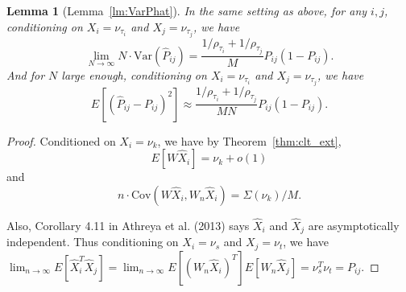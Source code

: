 \documentclass[10pt,letterpaper]{article}
\newtheorem{lemma}[fact]{Lemma}
\begin{document}
\begin{lemma}[Lemma~\ref{lm:VarPhat}]
In the same setting as above, for any $i, j$, conditioning on $X_i = \nu_{\tau_i}$ and $X_j = \nu_{\tau_j}$, we have
\[
	\lim_{N \to \infty} N \cdot \mathrm{Var}(\hat{P}_{ij}) =
    \frac{1/\rho_{\tau_i} + 1/\rho_{\tau_j}}{M} P_{ij} (1 - P_{ij}).
\]
And for $N$ large enough, conditioning on $X_i = \nu_{\tau_i}$ and $X_j = \nu_{\tau_j}$, we have
\[
	E[(\hat{P}_{ij} - P_{ij})^2] \approx
    \frac{1/\rho_{\tau_i} + 1/\rho_{\tau_j}}{M N} P_{ij}(1-P_{ij}).
\]
\end{lemma}
\begin{proof}
Conditioned on $X_i = \nu_k$, we have by Theorem~\ref{thm:clt_ext},
\[
	E[W \hat{X}_i] = \nu_k+o(1)
\]
and
\[
	n \cdot \mathrm{Cov}(W \hat{X}_i, W_n \hat{X}_i) = \Sigma(\nu_k)/M.
\]


Also, Corollary 4.11 in Athreya et al. (2013) says $\hat{X}_i$ and $\hat{X}_j$ are asymptotically independent. Thus conditioning on $X_i = \nu_s$ and $X_j = \nu_t$, we have $\lim_{n\to\infty}E[\hat{X}_i^T \hat{X}_j] = \lim_{n\to\infty}E[(W_n \hat{X}_i)^T] E[W_n \hat{X}_j] = \nu_s^T \nu_t = P_{ij}$.


\end{proof}
\end{document}
